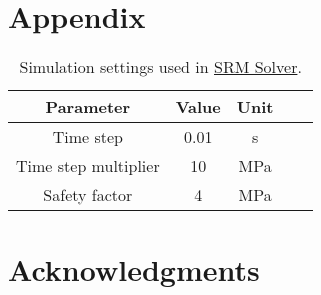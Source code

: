 \documentclass[journal]{new-aiaa}
\begin{document}
\section*{Appendix}

\begin{table}[H]
    \centering
    \caption{Simulation settings used in \href{https://github.com/felipebogaertsm/srm-solver}{SRM Solver}.}
    \begin{tabular}{|c|c|c|c|c|}
        \hline
        \textbf{Parameter} & \textbf{Value} & \textbf{Unit} \\
        \hline
        Time step & 0.01 & s \\ \hline
        Time step multiplier & 10 & MPa \\ 
        \hline
        Safety factor & 4 & MPa \\ 
        \hline
    \end{tabular}
    \label{tab:srm-solver-inputs}
\end{table}

\section*{Acknowledgments}


\end{document}
